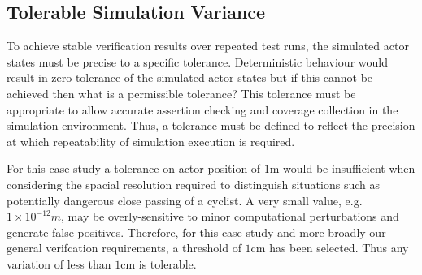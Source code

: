 \documentclass[letterpaper, 10 pt, journal, twoside]{IEEEtran}
\begin{document}

\subsection{Tolerable Simulation Variance}



To achieve stable verification results over repeated test runs, the simulated actor states must be precise to a specific tolerance.
%
Deterministic behaviour would result in zero tolerance of the simulated actor states but if this cannot be achieved then what is a permissible tolerance?
%
%
This tolerance must be appropriate to allow accurate assertion checking and coverage collection in the simulation environment.
%
Thus, a tolerance must be defined to reflect the precision at which repeatability of simulation execution is required. 

%
% 

%
For this case study a tolerance on actor position of $1$m would be insufficient when considering the spacial resolution required to distinguish situations such as potentially dangerous close passing of a cyclist. A very small value, e.g.\ $1\times10^{-12}m$, may be overly-sensitive to minor computational perturbations and generate false positives. 
Therefore, for this case study and more broadly our general verifcation requirements, a threshold of $1$cm has been selected. Thus any variation of less than $1$cm is tolerable. 
\end{document}
